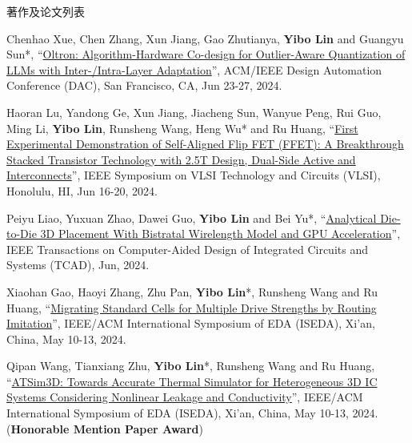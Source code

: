 \begin{rSection}{著作及论文列表}
\begin{description}[font=\normalfont, rightmargin=2em]
{}
            

\item[{[C150]}]{
        Chenhao Xue, Chen Zhang, Xun Jiang, Gao Zhutianya, \textbf{Yibo Lin} and Guangyu Sun*, 
    ``\href{https://doi.org/10.1145/3649329.3656221}{Oltron: Algorithm-Hardware Co-design for Outlier-Aware Quantization of LLMs with Inter-/Intra-Layer Adaptation}'', 
    ACM/IEEE Design Automation Conference (DAC), San Francisco, CA, Jun 23-27, 2024.
    
}
            

\item[{[C149]}]{
        Haoran Lu, Yandong Ge, Xun Jiang, Jiacheng Sun, Wanyue Peng, Rui Guo, Ming Li, \textbf{Yibo Lin}, Runsheng Wang, Heng Wu* and Ru Huang, 
    ``\href{https://doi.org/10.1109/VLSITechnologyandCir46783.2024.10631460}{First Experimental Demonstration of Self-Aligned Flip FET (FFET): A Breakthrough Stacked Transistor Technology with 2.5T Design, Dual-Side Active and Interconnects}'', 
    IEEE Symposium on VLSI Technology and Circuits (VLSI), Honolulu, HI, Jun 16-20, 2024.
    
}
            

\item[{[J148]}]{
        Peiyu Liao, Yuxuan Zhao, Dawei Guo, \textbf{Yibo Lin} and Bei Yu*, 
    ``\href{https://doi.org/10.1109/TCAD.2023.3347293}{Analytical Die-to-Die 3D Placement With Bistratal Wirelength Model and GPU Acceleration}'', 
    IEEE Transactions on Computer-Aided Design of Integrated Circuits and Systems (TCAD), Jun, 2024.
    
}
            

\item[{[C147]}]{
        Xiaohan Gao, Haoyi Zhang, Zhu Pan, \textbf{Yibo Lin}*, Runsheng Wang and Ru Huang, 
    ``\href{https://doi.org/10.1109/ISEDA62518.2024.10617650}{Migrating Standard Cells for Multiple Drive Strengths by Routing Imitation}'', 
    IEEE/ACM International Symposium of EDA (ISEDA), Xi'an, China, May 10-13, 2024.
    
}
            

\item[{[C146]}]{
        Qipan Wang, Tianxiang Zhu, \textbf{Yibo Lin}*, Runsheng Wang and Ru Huang, 
    ``\href{https://doi.org/10.1109/ISEDA62518.2024.10617604}{ATSim3D: Towards Accurate Thermal Simulator for Heterogeneous 3D IC Systems Considering Nonlinear Leakage and Conductivity}'', 
    IEEE/ACM International Symposium of EDA (ISEDA), Xi'an, China, May 10-13, 2024.
    (\textbf{Honorable Mention Paper Award})
}
            


\end{description}
\end{rSection}
